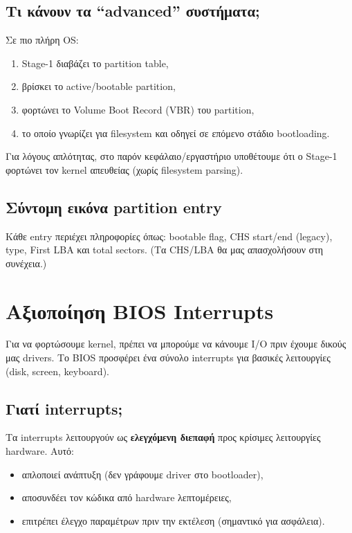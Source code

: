 \documentclass[18pt]{extarticle}
\begin{document}
\subsection{Τι κάνουν τα “advanced” συστήματα;}

Σε πιο πλήρη OS:
\begin{enumerate}
    \item Stage-1 διαβάζει το partition table,
    \item βρίσκει το active/bootable partition,
    \item φορτώνει το Volume Boot Record (VBR) του partition,
    \item το οποίο γνωρίζει για filesystem και οδηγεί σε επόμενο στάδιο bootloading.
\end{enumerate}

\begin{info}[Σημείωση]
Για λόγους απλότητας, στο παρόν κεφάλαιο/εργαστήριο υποθέτουμε ότι ο Stage-1 φορτώνει τον kernel απευθείας
(χωρίς filesystem parsing).
\end{info}

\subsection{Σύντομη εικόνα partition entry}

Κάθε entry περιέχει πληροφορίες όπως: bootable flag, CHS start/end (legacy), type, First LBA και total sectors.
(Τα CHS/LBA θα μας απασχολήσουν στη συνέχεια.)


\section{Αξιοποίηση BIOS Interrupts}

Για να φορτώσουμε kernel, πρέπει να μπορούμε να κάνουμε I/O πριν έχουμε δικούς μας drivers.
Το BIOS προσφέρει ένα σύνολο interrupts για βασικές λειτουργίες (disk, screen, keyboard).

\subsection{Γιατί interrupts;}

Τα interrupts λειτουργούν ως \textbf{ελεγχόμενη διεπαφή} προς κρίσιμες λειτουργίες hardware.
Αυτό:
\begin{itemize}
    \item απλοποιεί ανάπτυξη (δεν γράφουμε driver στο bootloader),
    \item αποσυνδέει τον κώδικα από hardware λεπτομέρειες,
    \item επιτρέπει έλεγχο παραμέτρων πριν την εκτέλεση (σημαντικό για ασφάλεια).
\end{itemize}
\end{document}
